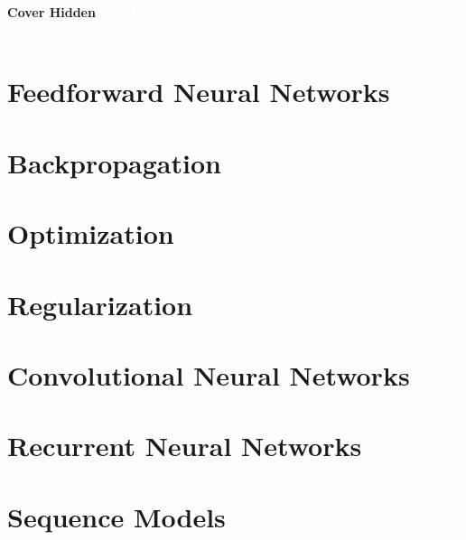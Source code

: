 \documentclass[11pt,fleqn,oneside]{book} %
\newcommand{\AUTHOR}{Federico Brancasi}
\newcommand{\DATE}{\today}
\newcommand{\TITLE}{Deep Learning}
\newcommand{\SUBTITLE}{University of Trento}
\newcommand{\SUBJECT}{Demo}
\renewcommand{\coverpage}[5]{{\Huge\textbf{Cover Hidden}}
    \textcolor{white}{#1, #2, #3, #4, #5}}
\begin{document}

\coverpage{\TITLE}{\SUBTITLE}{\AUTHOR}{\DATE}{\SUBJECT}

\newpage
\tableofcontents


\newpage
\chapter{Feedforward Neural Networks} 


\newpage
\chapter{Backpropagation} 


\newpage
\chapter{Optimization}


\newpage
\chapter{Regularization}


\newpage
\chapter{Convolutional Neural Networks}


\newpage
\chapter{Recurrent Neural Networks}


\newpage
\chapter{Sequence Models}

\end{document}

